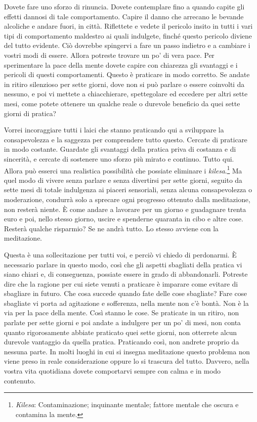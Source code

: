 Dovete fare uno sforzo di rinuncia. Dovete contemplare fino a quando
capite gli effetti dannosi di tale comportamento. Capire il danno che
arrecano le bevande alcoliche e andare fuori, in città. Riflettete e
vedete il pericolo insito in tutti i vari tipi di comportamento
maldestro ai quali indulgete, finché questo pericolo diviene del tutto
evidente. Ciò dovrebbe spingervi a fare un passo indietro e a cambiare i
vostri modi di essere. Allora potreste trovare un po' di vera pace. Per
sperimentare la pace della mente dovete capire con chiarezza gli
svantaggi e i pericoli di questi comportamenti. Questo è praticare in
modo corretto. Se andate in ritiro silenzioso per sette giorni, dove non
si può parlare o essere coinvolti da nessuno, e poi vi mettete a
chiacchierare, spettegolare ed eccedere per altri sette mesi, come
potete ottenere un qualche reale o durevole beneficio da quei sette
giorni di pratica?

Vorrei incoraggiare tutti i laici che stanno praticando qui a sviluppare
la consapevolezza e la saggezza per comprendere tutto questo. Cercate di
praticare in modo costante. Guardate gli svantaggi della pratica priva
di costanza e di sincerità, e cercate di sostenere uno sforzo più mirato
e continuo. Tutto qui. Allora può esserci una realistica possibilità che
possiate eliminare i \emph{kilesa}.\footnote{\emph{Kilesa}:
  Contaminazione; inquinante mentale; fattore mentale che oscura e
  contamina la mente.} Ma quel modo di vivere senza parlare e senza
divertirsi per sette giorni, seguito da sette mesi di totale indulgenza
ai piaceri sensoriali, senza alcuna consapevolezza o moderazione,
condurrà solo a sprecare ogni progresso ottenuto dalla meditazione, non
resterà niente. È come andare a lavorare per un giorno e guadagnare
trenta euro e poi, nello stesso giorno, uscire e spenderne quaranta in
cibo e altre cose. Resterà qualche risparmio? Se ne andrà tutto. Lo
stesso avviene con la meditazione.

Questa è una sollecitazione per tutti voi, e perciò vi chiedo di
perdonarmi. È necessario parlare in questo modo, così che gli aspetti
sbagliati della pratica vi siano chiari e, di conseguenza, possiate
essere in grado di abbandonarli. Potreste dire che la ragione per cui
siete venuti a praticare è imparare come evitare di sbagliare in futuro.
Che cosa succede quando fate delle cose sbagliate? Fare cose sbagliate
vi porta ad agitazione e sofferenza, nella mente non c'è bontà. Non è la
via per la pace della mente. Così stanno le cose. Se praticate in un
ritiro, non parlate per sette giorni e poi andate a indulgere per un po'
di mesi, non conta quanto rigorosamente abbiate praticato quei sette
giorni, non otterrete alcun durevole vantaggio da quella pratica.
Praticando così, non andrete proprio da nessuna parte. In molti luoghi
in cui si insegna meditazione questo problema non viene preso in reale
considerazione oppure lo si trascura del tutto. Davvero, nella vostra
vita quotidiana dovete comportarvi sempre con calma e in modo contenuto.

